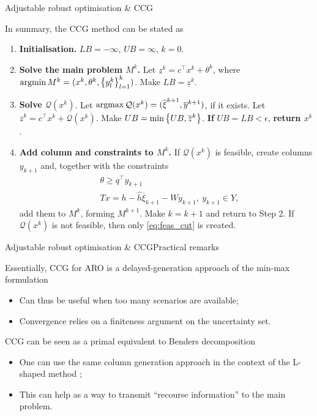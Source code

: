 \begin{frame}{Adjustable robust optimisation \& CCG}

	In summary, the CCG method can be stated as
	\begin{enumerate}[<+->]
		\item {\bf Initialisation.} $LB = -\infty$, $UB = \infty$, $k = 0$.
		\item {\bf Solve the main problem $M^k$.} Let $\underline{z}^k = c^\top x^k + \theta^k$, where $\mathop{\rm argmin} M^k = (x^k, \theta^k, \left\{ y_l^k \right \}_{l=1}^k)$. Make $LB = \underline{z}^k$.
	\item {\bf Solve $\mathcal{Q}(x^k)$}. Let $\mathop{\rm argmax} \mathcal{Q}(x^k)=(\overline{\xi}^{k+1}, \overline{y}^{k+1})$, if it exists. Let $\overline{z}^{k} = c^\top x^k + \mathcal{Q}(x^k)$. Make  $UB = \min\left\{ UB, \overline{z}^{k} \right \}$. {\bf If} $UB = LB < \epsilon$, {\bf return $x^k$}.
	\item {\bf Add column and constraints to $M^k$.} If $\mathcal{Q}(x^k)$ is feasible, create columns $y_{k+1}$ and, together with the constraints
		\begin{align}
			& \theta \geq q^\top y_{k+1} \\
			& Tx = h - \hat{h} \overline{\xi}_{k+1} - Wy_{k+1}, \ y_{k+1} \in Y,	 \label{eq:feas_cut}	
		\end{align}
  	add them to $M^k$, forming $M^{k+1}$. Make $k = k+1$ and return to {\color{blue}Step 2}. If $\mathcal{Q}(x^k)$ is not feasible, then only \eqref{eq:feas_cut} is created.
\end{enumerate}
	
\end{frame}


\begin{frame}{Adjustable robust optimisation \& CCG}{Practical remarks}

	Essentially, CCG for ARO is a \alert{delayed-generation} approach of the min-max formulation
	\begin{itemize}
		\item Can thus be useful when \alert{too many scenarios} are available;
		\item Convergence relies on a \alert{finiteness argument} on the uncertainty set.	
	\end{itemize}
	
	\pause
	CCG can be seen as a \alert{primal equivalent} to Benders decomposition
	\begin{itemize}
		\item One can use the same column generation approach in the context of the L-shaped method {\small \cite{van1969shaped}};
		\item This can help as a way to \alert{transmit} ``recourse information'' to the main problem.	
	\end{itemize}

\end{frame}


